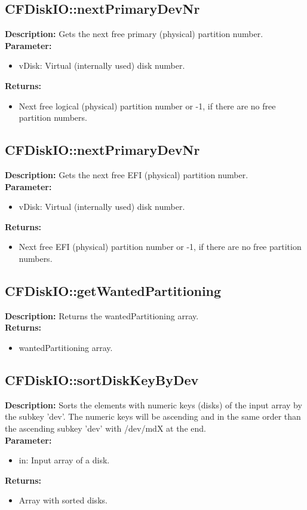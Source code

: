 \subsection{CFDiskIO::nextPrimaryDevNr}
\textbf{Description:} Gets the next free primary (physical) partition number.\\
\textbf{Parameter:}
\begin{itemize}
\item vDisk: Virtual (internally used) disk number.
\end{itemize}
\textbf{Returns:}
\begin{itemize}
\item Next free logical (physical) partition number or -1, if there are no free partition numbers.
\end{itemize}

\subsection{CFDiskIO::nextPrimaryDevNr}
\textbf{Description:} Gets the next free EFI (physical) partition number.\\
\textbf{Parameter:}
\begin{itemize}
\item vDisk: Virtual (internally used) disk number.
\end{itemize}
\textbf{Returns:}
\begin{itemize}
\item Next free EFI (physical) partition number or -1, if there are no free partition numbers.
\end{itemize}

\subsection{CFDiskIO::getWantedPartitioning}
\textbf{Description:} Returns the wantedPartitioning array.\\
\textbf{Returns:}
\begin{itemize}
\item wantedPartitioning array.
\end{itemize}

\subsection{CFDiskIO::sortDiskKeyByDev}
\textbf{Description:} Sorts the elements with numeric keys (disks) of the input array by the subkey 'dev'. The numeric keys will be ascending and in the same order than the ascending subkey 'dev' with /dev/mdX at the end.\\
\textbf{Parameter:}
\begin{itemize}
\item in: Input array of a disk.
\end{itemize}
\textbf{Returns:}
\begin{itemize}
\item Array with sorted disks.
\end{itemize}

